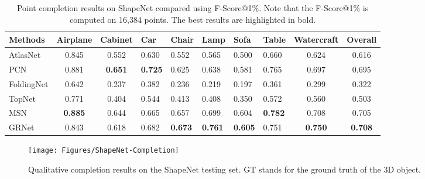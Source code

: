\documentclass[runningheads]{llncs}
\begin{document}
\begin{table*}[!t]
  \caption{Point completion results on ShapeNet compared using F-Score@1\%. Note that the F-Score@1\% is computed on 16,384 points. The best results are highlighted in bold.}
  \begin{tabularx}{\linewidth}{l|ccYYYYYc|c}
    \toprule
    Methods      & Airplane   & Cabinet    & Car        & Chair 
                 & Lamp       & Sofa       & Table      & Watercraft 
                 & Overall \\
    \midrule  
    AtlasNet \cite{DBLP:conf/cvpr/GroueixFKRA18}    
                 & 0.845      & 0.552      & 0.630      & 0.552
                 & 0.565      & 0.500      & 0.660      & 0.624
                 & 0.616 \\
    PCN \cite{DBLP:conf/ThreeDim/YuanKHMH18}
                 & 0.881      & \bf{0.651} & \bf{0.725} & 0.625
                 & 0.638      & 0.581      & 0.765      & 0.697
                 & 0.695 \\
    FoldingNet \cite{DBLP:conf/cvpr/YangFST18}
                 & 0.642      & 0.237      & 0.382      & 0.236
                 & 0.219      & 0.197      & 0.361      & 0.299 
                 & 0.322 \\
    TopNet \cite{DBLP:conf/cvpr/TchapmiKR0S19}
                 & 0.771      & 0.404      & 0.544      & 0.413
                 & 0.408      & 0.350      & 0.572      & 0.560
                 & 0.503 \\
    MSN \cite{DBLP:conf/aaai/LiuSYSH20}
                 & \bf{0.885} & 0.644      & 0.665      & 0.657 
                 & 0.699      & 0.604      & \bf{0.782} & 0.708
                 & 0.705 \\
    GRNet        & 0.843      & 0.618      & 0.682      & \bf{0.673}
                 & \bf{0.761} & \bf{0.605} & 0.751      & \bf{0.750} 
                 & \bf{0.708} \\
  	\bottomrule
  \end{tabularx}
  \label{tab:shapenet-reconstruction-fscore}
\end{table*}

\begin{figure*}[!t]
  \resizebox{\linewidth}{!} {
    \texttt{[image: Figures/ShapeNet-Completion]}
  }
  \caption{Qualitative completion results on the ShapeNet testing set. GT stands for the ground truth of the 3D object.}
  \label{fig:shapenet-reconstruction}
\end{figure*}
\end{document}
